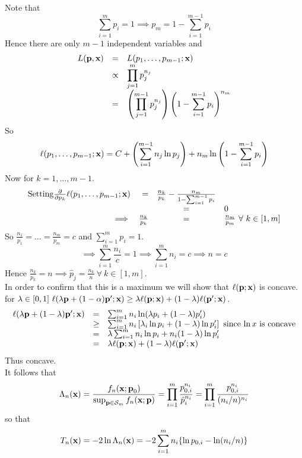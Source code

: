 \documentclass[11pt,a4paper]{article}
\begin{document}
Note that
$$\sum_{i=1}^mp_i=1\implies p_m=1-\sum_{i=1}^{m-1}p_i$$
Hence there are only $m-1$ independent variables and
\[\begin{array}{rcl}
L(\textbf{p},\textbf{x})&=&L(p_1,\dots,p_{m-1};\textbf{x})\\
&\propto&{\displaystyle \prod_{j=1}^mp_j^{n_j}}\\
&=&{\displaystyle\left(\prod_{j=1}^{m-1}p_j^{n_j}\right)\left(1-\sum_{i=1}^{m-1}p_i\right)^{n_m}}
\end{array}\]
So
$$\ell(p_1,\dots,p_{m-1};\textbf{x})=C+\left(\sum_{i=1}^{m-1}n_j\ln p_j\right)+n_m\ln\left(1-\sum_{i=1}^{m-1}p_i\right)$$
Now for $k=1,\dots,m-1$.\\
\[\begin{array}{rrcl}
\text{Setting}\frac{\partial}{\partial p_k}\ell(p_1,\dots,p_{m-1};\x)&=&\frac{n_k}{p_k}-\frac{n_m}{1-\sum_{i=1}^{m-1}p_i}\\
&&=&0\\
\implies&\frac{n_k}{p_k}&=&\frac{n_m}{p_m}\ \forall\ k\in[1,m]
\end{array}\]
So $\frac{n_1}{p_1}=\dots=\frac{n_m}{p_m}=c$ and $\sum_{i=1}^mp_i=1$.\\
$$\implies\sum_{i=1}^m\frac{n_i}{c}=1\implies\sum_{i=1}^mn_i=c\implies n=c$$
Hence $\frac{n_k}{p_k}=n\implies\hat{p}_j=\frac{n_k}{n}\ \forall\ k\in[1,m]$.\\
In order to confirm that this is a maximum we will show that $\ell(\textbf{p};\textbf{x})$ is concave.\\
\ie for $\lambda\in[0,1]\ \ell(\lambda \textbf{p}+(1-\alpha)\textbf{p}';\textbf{x})\geq\lambda\ell(\textbf{p};\textbf{x})+(1-\lambda)\ell(\textbf{p}';\textbf{x})$.
\[\begin{array}{rcl}
\ell(\lambda\textbf{p}+(1-\lambda)\textbf{p}';\textbf{x})&=&\sum_{i=1}^m n_i\ln(\lambda p_i+(1-\lambda)p_i')\\
&\geq&\sum_{i=1}^mn_i\left[\lambda_i\ln p_i + (1-\lambda)\ln p_i'\right]\text{ since $\ln x$ is concave}\\
&=&\lambda\sum_{i=1}^mn_i\ln p_i+n_i(1-\lambda)\ln p'_i\\
&=&\lambda\ell(\textbf{p};\textbf{x})+(1-\lambda)\ell(\textbf{p}';\textbf{x})
\end{array}\]
Thus concave.\\
It follows that
$$\Lambda_n(\textbf{x})=\frac{f_n(\textbf{x};\textbf{p}_0)}{\sup_{\textbf{p}\in\mathcal{S}_m}f_n(\textbf{x};\textbf{p})}=\prod_{i=1}^m\frac{p_{0,i}^{n_i}}{\hat{p}_i^{n_i}}=\prod_{i=1}^m\frac{p_{0,i}^{n_i}}{(n_i/n)^{n_i}}$$
so that
$$T_n(\textbf{x})=-2\ln\Lambda_n(\textbf{x})=-2\sum_{i=1}^mn_i\{\ln p_{0,i}-\ln(n_i/n)\}$$
\end{document}
